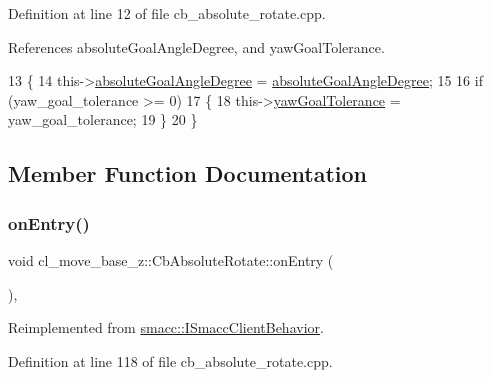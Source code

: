 Definition at line 12 of file cb\+\_\+absolute\+\_\+rotate.\+cpp.



References absolute\+Goal\+Angle\+Degree, and yaw\+Goal\+Tolerance.


\begin{DoxyCode}
13 \{
14     this->\hyperlink{classcl__move__base__z_1_1CbAbsoluteRotate_ad5d0e21549940444e1cb525cda73329a}{absoluteGoalAngleDegree} = 
      \hyperlink{classcl__move__base__z_1_1CbAbsoluteRotate_ad5d0e21549940444e1cb525cda73329a}{absoluteGoalAngleDegree};
15 
16     \textcolor{keywordflow}{if} (yaw\_goal\_tolerance >= 0)
17     \{
18         this->\hyperlink{classcl__move__base__z_1_1CbAbsoluteRotate_a8d8b5b9c2c821efe101bb07c96c4bdd3}{yawGoalTolerance} = yaw\_goal\_tolerance;
19     \}
20 \}
\end{DoxyCode}


\subsection{Member Function Documentation}
\mbox{\label{classcl__move__base__z_1_1CbAbsoluteRotate_a10418ea360809fa649d295716b152b2b}} 
\subsubsection{\texorpdfstring{on\+Entry()}{onEntry()}}
{\footnotesize\ttfamily void cl\+\_\+move\+\_\+base\+\_\+z\+::\+Cb\+Absolute\+Rotate\+::on\+Entry (\begin{DoxyParamCaption}{ }\end{DoxyParamCaption})\hspace{0.3cm}{\ttfamily [override]}, {\ttfamily [virtual]}}



Reimplemented from \hyperlink{classsmacc_1_1ISmaccClientBehavior_a3ec24a839087c550e1d62a81e48cf530}{smacc\+::\+I\+Smacc\+Client\+Behavior}.



Definition at line 118 of file cb\+\_\+absolute\+\_\+rotate.\+cpp.



